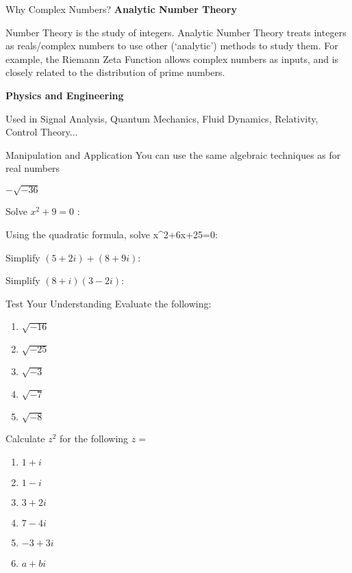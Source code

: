 \documentclass{beamer}
\begin{document}
	\begin{frame}[shrink=15]{Why Complex Numbers?}
	    \textbf{Analytic Number Theory}
	    
	    Number Theory is the study of integers. Analytic Number Theory treats integers as reals/complex numbers to use other (‘analytic’) methods to study them. For example, the Riemann Zeta Function allows complex numbers as inputs, and is closely related to the distribution of prime numbers. 
	    
        \textbf{Physics and Engineering}
        
        Used in Signal Analysis, Quantum Mechanics, Fluid Dynamics, Relativity, Control Theory...
        
	\end{frame}
	
	\begin{frame}[shrink=15]{Manipulation and Application}
	    \alert<1>{You can use the same algebraic techniques as for real numbers}

	    $-\sqrt{-36}$ 
	    
	    Solve $x^2+9=0$ : 
	    
	    Using the quadratic formula, solve x^2+6x+25=0: 
	    
	    Simplify $(5+2i)+(8+9i)$: 
	    
	    Simplify $(8+i)(3-2i)$: 
	\end{frame}
	
	\begin{frame}[shrink=15]{Test Your Understanding}
	    Evaluate the following:
	    \begin{enumerate}[label={(\alph*)}]
	        \item $\sqrt{-16}$ 
	        \item $\sqrt{-25}$ 
	        \item $\sqrt{-3}$ 
	        \item $\sqrt{-7}$ 
	        \item $\sqrt{-8}$ 
	    \end{enumerate}
	    
	    Calculate $z^2$ for the following $z=$
	    \begin{enumerate}[label={(\alph*)}]
	        \item $1+i$ 
	        \item $1-i$ 
	        \item $3+2i$ 
	        \item $7-4i$ 
	        \item $-3+3i$ 
	        \item $a+bi$ 
	    \end{enumerate}
	    
	\end{frame}
	
\end{document}
